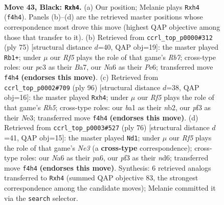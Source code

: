 \documentclass[11pt]{article}
\begin{document}
\clearpage

\begin{figure}[p]\centering
\begin{subfigure}{0.46\textwidth}\centering
\resizebox{\linewidth}{!}{%
\newchessgame
\chessboard[
  setfen={8/1p2pk1p/n5p1/pNp5/5r1P/2P2P2/P2R4/B5K1 b - - 2 43},
  showmover=false,
  pgfstyle=straightmove, color=movearrow, markmove={f4-h4}
]}
\caption{}
\end{subfigure}\hfill
\begin{subfigure}{0.46\textwidth}\centering
\resizebox{\linewidth}{!}{%
\newchessgame
\chessboard[
  setfen={6k1/b1p2pp1/P3p3/2p1P3/R6p/5P2/1r2B1PP/4K3 b - - 1 38},
  showmover=false,
  pgfstyle=straightmove, color=movearrow, markmove={b2-b1}
]}
\caption{}
\end{subfigure}
\\[4pt]
\begin{subfigure}{0.46\textwidth}\centering
\resizebox{\linewidth}{!}{%
\newchessgame
\chessboard[
  setfen={8/4kp2/p3p3/2p1P2R/P6p/2r1NP2/1n2K1PP/8 w - - 0 49},
  showmover=false,
  pgfstyle=straightmove, color=movearrow, markmove={h5-h4}
]}
\caption{}
\end{subfigure}\hfill
\begin{subfigure}{0.46\textwidth}\centering
\resizebox{\linewidth}{!}{%
\newchessgame
\chessboard[
  setfen={8/3r4/p2n2kp/P2P4/2p2RP1/1p2N3/1P4KP/8 w - - 0 39},
  showmover=false,
  pgfstyle=straightmove, color=movearrow, markmove={e3-d1}
]}
\caption{}
\end{subfigure}
\caption{\textbf{Move 43, Black: \texttt{Rxh4}.} (a) Our position; Melanie plays \texttt{Rxh4} (\texttt{f4h4}). Panels (b)--(d) are the retrieved master positions whose correspondence most drove this move (highest QAP objective among those that transfer to it). (b) Retrieved from \texttt{ccrl\_top\_p0000\#312} (ply 75) [structural distance $d$=40, QAP obj=19]: the master played \texttt{Rb1+}; under $\mu$ our \emph{Rf5} plays the role of that game's \emph{Rb7}; cross-type roles: our \emph{p}c3 as their \emph{B}a7, our \emph{N}a6 as their \emph{P}e6; transferred move \texttt{f4h4} \textbf{(endorses this move)}. (c) Retrieved from \texttt{ccrl\_top\_p0002\#709} (ply 96) [structural distance $d$=38, QAP obj=16]: the master played \texttt{Rxh4}; under $\mu$ our \emph{Rf5} plays the role of that game's \emph{Rh5}; cross-type roles: our \emph{b}a1 as their \emph{n}b2, our \emph{p}f3 as their \emph{N}e3; transferred move \texttt{f4h4} \textbf{(endorses this move)}. (d) Retrieved from \texttt{ccrl\_top\_p0003\#527} (ply 76) [structural distance $d$=41, QAP obj=15]: the master played \texttt{Nd1}; under $\mu$ our \emph{Rf5} plays the role of that game's \emph{Ne3} (a \textbf{cross-type} correspondence); cross-type roles: our \emph{N}a6 as their \emph{p}a6, our \emph{p}f3 as their \emph{n}d6; transferred move \texttt{f4h4} \textbf{(endorses this move)}. Synthesis: 6 retrieved analogs transferred to \texttt{Rxh4} (summed QAP objective 83, the strongest correspondence among the candidate moves); Melanie committed it via the \texttt{search} selector.}
\label{fig:thought-m85}
\end{figure}
\end{document}
